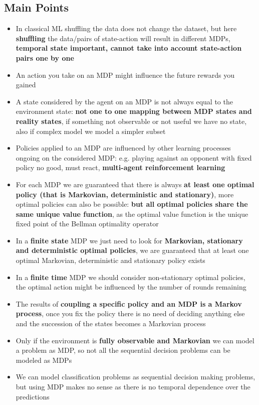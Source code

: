 \subsection{Main Points}
    \begin{itemize}
        \item In classical ML shuffling the data does not change the dataset, but here \textbf{shuffling} the data/pairs of state-action will result in different MDPs, \textbf{temporal state important, cannot take into account state-action pairs one by one}
        \item An action you take on an MDP might influence the future rewards you gained
        \item A state considered by the agent on an MDP is not always equal to the environment state: \textbf{not one to one mapping between MDP states and reality states}, if something not observable or not useful we have no state, also if complex model we model a simpler subset
        \item Policies applied to an MDP are influenced by other learning processes ongoing on the considered MDP: e.g. playing against an opponent with fixed policy no good, must react, \textbf{multi-agent reinforcement learning}
        \item For each MDP we are guaranteed that there is always \textbf{at least one optimal policy (that is Markovian, deterministic and stationary)}, more optimal policies can also be possible: \textbf{but all optimal policies share the same unique value function}, as the optimal value function is the unique fixed point of the Bellman optimality operator
        \item In a \textbf{finite state} MDP we just need to look for \textbf{Markovian, stationary and deterministic optimal policies}, we are guaranteed that at least one optimal Markovian, deterministic and stationary policy exists
        \item In a \textbf{finite time} MDP we should consider non-stationary optimal policies, the optimal action might be influenced by the number of rounds remaining
        \item The results of \textbf{coupling a specific policy and an MDP is a Markov process}, once you fix the policy there is no need of deciding anything else and the succession of the states becomes a Markovian process
        \item Only if the environment is \textbf{fully observable and Markovian} we can model a problem as MDP, so not all the sequential decision problems can be modeled as MDPs
        \item We can model classification problems as sequential decision making problems, but using MDP makes no sense as there is no temporal dependence over the predictions
    \end{itemize}